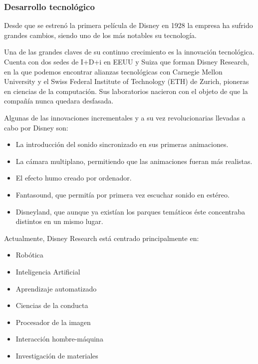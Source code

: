 \subsubsection{Desarrollo tecnológico}

Desde que se estrenó la primera película de Disney en 1928 la empresa ha sufrido
grandes cambios, siendo uno de los más notables su tecnología.

Una de las grandes claves de su continuo crecimiento es la innovación tecnológica. Cuenta con dos sedes de I+D+i en EEUU y Suiza que forman Disney Research, en la que podemos encontrar alianzas tecnológicas con Carnegie Mellon University y el Swiss Federal Institute of Technology (ETH) de Zurich, pioneras en ciencias de la computación. Sus laboratorios nacieron con el objeto de que la compañía nunca quedara desfasada.

Algunas de las innovaciones incrementales y a su vez revolucionarias llevadas a cabo por Disney son:

\begin{itemize}

\item
La introducción del sonido sincronizado en sus primeras animaciones.

\item
La cámara multiplano, permitiendo que las animaciones fueran más realistas.

\item
El efecto humo creado por ordenador.

\item
Fantasound, que permitía por primera vez escuchar sonido en estéreo.

\item
Disneyland, que aunque ya existían los parques temáticos éste concentraba distintos en un mismo lugar.

\end{itemize}

Actualmente, Disney Research está centrado principalmente en:

\begin{itemize}

\item
Robótica

\item
Inteligencia Artificial

\item
Aprendizaje automatizado

\item
Ciencias de la conducta

\item
Procesador de la imagen

\item
Interacción hombre-máquina

\item
Investigación de materiales

\end{itemize}

